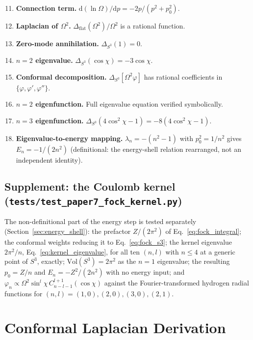 \documentclass[aps,pra,twocolumn,superscriptaddress,longbibliography]{revtex4-2}
\begin{document}
\begin{enumerate}\setcounter{enumi}{10}
\item \textbf{Connection term.} $\mathrm{d}(\ln\Omega)/\mathrm{d}p = -2p/(p^2 + p_0^2)$.
\item \textbf{Laplacian of $\Omega^2$.} $\Delta_{\text{flat}}(\Omega^2)/\Omega^2$ is a rational function.
\item \textbf{Zero-mode annihilation.} $\Delta_{S^3}(1) = 0$.
\item \textbf{$n=2$ eigenvalue.} $\Delta_{S^3}(\cos\chi) = -3\cos\chi$.
\item \textbf{Conformal decomposition.} $\Delta_{S^3}[\Omega^2 \varphi]$ has rational coefficients in $\{\varphi, \varphi', \varphi''\}$.
\item \textbf{$n=2$ eigenfunction.} Full eigenvalue equation verified symbolically.
\item \textbf{$n=3$ eigenfunction.} $\Delta_{S^3}(4\cos^2\chi - 1) = -8(4\cos^2\chi - 1)$.
\item \textbf{Eigenvalue-to-energy mapping.} $\lambda_n = -(n^2-1)$ with $p_0^2 = 1/n^2$ gives $E_n = -1/(2n^2)$ (definitional: the energy-shell relation rearranged, not an independent identity).
\end{enumerate}

\subsection{Supplement: the Coulomb kernel (\texttt{tests/test\_paper7\_fock\_kernel.py})}

The non-definitional part of the energy step is tested separately (Section~\ref{sec:energy_shell}): the prefactor $Z/(2\pi^2)$ of Eq.~\eqref{eq:fock_integral}; the conformal weights reducing it to Eq.~\eqref{eq:fock_s3}; the kernel eigenvalue $2\pi^2/n$, Eq.~\eqref{eq:kernel_eigenvalue}, for all ten $(n,l)$ with $n \le 4$ at a generic point of $S^3$, exactly; $\mathrm{Vol}(S^3) = 2\pi^2$ as the $n = 1$ eigenvalue; the resulting $p_0 = Z/n$ and $E_n = -Z^2/(2n^2)$ with no energy input; and $\varphi_n \propto \Omega^2\sin^l\!\chi\,C^{l+1}_{n-l-1}(\cos\chi)$ against the Fourier-transformed hydrogen radial functions for $(n,l) = (1,0), (2,0), (3,0), (2,1)$.


\section{Conformal Laplacian Derivation}
\label{app:derivation}
\end{document}

